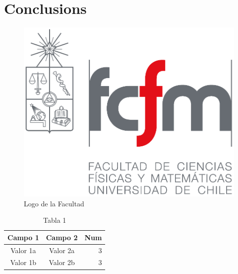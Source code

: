 \chapter{Conclusions}

\lipsum[130-132]
\begin{figure}
	\centering
	\includegraphics[scale=.2]{imagenes/fcfm.pdf}
	\caption{Logo de la Facultad}
	\label{logofcfm}
\end{figure}

\lipsum[133-134]

\begin{table}
	\centering
	\caption{Tabla 1}
	\label{tabla:1}
	\begin{tabular}{|c|c|r|}
		\hline
		\textbf{Campo 1} & \textbf{Campo 2} & \textbf{Num} \\\hline
		Valor 1a & Valor 2a & 3\\
		Valor 1b & Valor 2b & 3\\
		\hline
	\end{tabular}

\end{table}

\lipsum[135]
